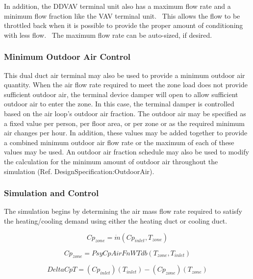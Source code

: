 In addition, the DDVAV terminal unit also has a maximum flow rate and a minimum flow fraction like the VAV terminal unit.~ This allows the flow to be throttled back when it is possible to provide the proper amount of conditioning with less flow.~ The maximum flow rate can be auto-sized, if desired.

\subsubsection{Minimum Outdoor Air Control}\label{minimum-outdoor-air-control-1}

This dual duct air terminal may also be used to provide a minimum outdoor air quantity. When the air flow rate required to meet the zone load does not provide sufficient outdoor air, the terminal device damper will open to allow sufficient outdoor air to enter the zone. In this case, the terminal damper is controlled based on the air loop's outdoor air fraction. The outdoor air may be specified as a fixed value per person, per floor area, or per zone or as the required minimum air changes per hour. In addition, these values may be added together to provide a combined minimum outdoor air flow rate or the maximum of each of these values may be used. An outdoor air fraction schedule may also be used to modify the calculation for the minimum amount of outdoor air throughout the simulation (Ref. DesignSpecification:OutdoorAir).

\subsubsection{Simulation and Control}\label{simulation-and-control-6}

The simulation begins by determining the air mass flow rate required to satisfy the heating/cooling demand using either the heating duct or cooling duct.

\begin{equation}
C{p_{zone}} = \dot m\left( {C{p_{inlet}},{T_{zone}}} \right)
\end{equation}

\begin{equation}
C{p_{zone}} = PsyCpAirFnWTdb\left( {{T_{zone}},{T_{inlet}}} \right)
\end{equation}

\begin{equation}
DeltaCpT = \left( {C{p_{inlet}}} \right)\left( {{T_{inlet}}} \right) - \left( {C{p_{zone}}} \right)\left( {{T_{zone}}} \right)
\end{equation}

